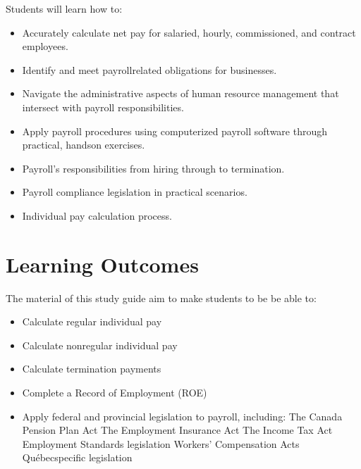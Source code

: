 \documentclass[letterpaper,10pt,english]{sphinxmanual}
\begin{document}
\sphinxAtStartPar
Students will learn how to:
\begin{itemize}
\item {} 
\sphinxAtStartPar
Accurately calculate net pay for salaried, hourly, commissioned, and contract employees.

\item {} 
\sphinxAtStartPar
Identify and meet payroll\sphinxhyphen{}related obligations for businesses.

\item {} 
\sphinxAtStartPar
Navigate the administrative aspects of human resource management that intersect with payroll responsibilities.

\item {} 
\sphinxAtStartPar
Apply payroll procedures using computerized payroll software through practical, hands\sphinxhyphen{}on exercises.

\item {} 
\sphinxAtStartPar
Payroll’s responsibilities from hiring through to termination.

\item {} 
\sphinxAtStartPar
Payroll compliance legislation in practical scenarios.

\item {} 
\sphinxAtStartPar
Individual pay calculation process.

\end{itemize}


\section{Learning Outcomes}
\label{\detokenize{preface:learning-outcomes}}
\sphinxAtStartPar
The material of this study guide aim to make students to be be able to:
\begin{itemize}
\item {} 
\sphinxAtStartPar
Calculate regular individual pay

\item {} 
\sphinxAtStartPar
Calculate non\sphinxhyphen{}regular individual pay

\item {} 
\sphinxAtStartPar
Calculate termination payments

\item {} 
\sphinxAtStartPar
Complete a Record of Employment (ROE)

\item {} 
\sphinxAtStartPar
Apply federal and provincial legislation to payroll, including:
\sphinxhyphen{} The Canada Pension Plan Act
\sphinxhyphen{} The Employment Insurance Act
\sphinxhyphen{} The Income Tax Act
\sphinxhyphen{} Employment Standards legislation
\sphinxhyphen{} Workers’ Compensation Acts
\sphinxhyphen{} Québec\sphinxhyphen{}specific legislation

\end{itemize}
\end{document}
